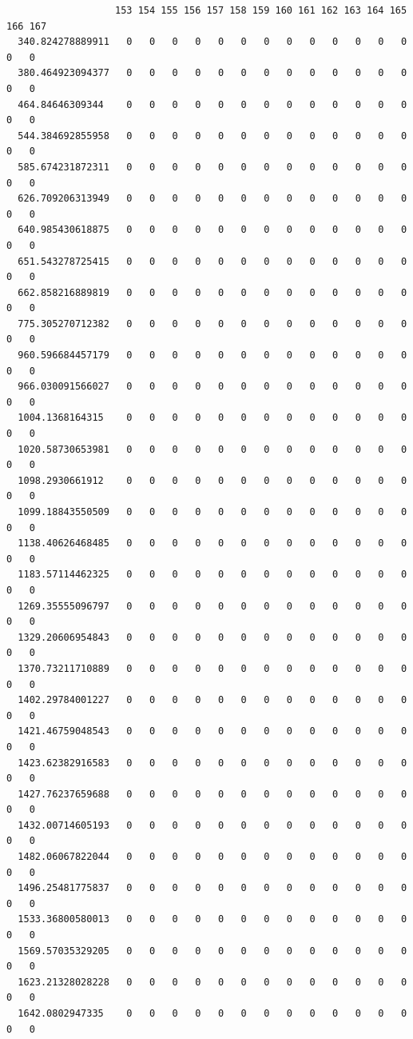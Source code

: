 \documentclass[
  letterpaper,
  DIV=11,
  numbers=noendperiod]{scrartcl}
\begin{document}
\begin{verbatim}
                   153 154 155 156 157 158 159 160 161 162 163 164 165 166 167
  340.824278889911   0   0   0   0   0   0   0   0   0   0   0   0   0   0   0
  380.464923094377   0   0   0   0   0   0   0   0   0   0   0   0   0   0   0
  464.84646309344    0   0   0   0   0   0   0   0   0   0   0   0   0   0   0
  544.384692855958   0   0   0   0   0   0   0   0   0   0   0   0   0   0   0
  585.674231872311   0   0   0   0   0   0   0   0   0   0   0   0   0   0   0
  626.709206313949   0   0   0   0   0   0   0   0   0   0   0   0   0   0   0
  640.985430618875   0   0   0   0   0   0   0   0   0   0   0   0   0   0   0
  651.543278725415   0   0   0   0   0   0   0   0   0   0   0   0   0   0   0
  662.858216889819   0   0   0   0   0   0   0   0   0   0   0   0   0   0   0
  775.305270712382   0   0   0   0   0   0   0   0   0   0   0   0   0   0   0
  960.596684457179   0   0   0   0   0   0   0   0   0   0   0   0   0   0   0
  966.030091566027   0   0   0   0   0   0   0   0   0   0   0   0   0   0   0
  1004.1368164315    0   0   0   0   0   0   0   0   0   0   0   0   0   0   0
  1020.58730653981   0   0   0   0   0   0   0   0   0   0   0   0   0   0   0
  1098.2930661912    0   0   0   0   0   0   0   0   0   0   0   0   0   0   0
  1099.18843550509   0   0   0   0   0   0   0   0   0   0   0   0   0   0   0
  1138.40626468485   0   0   0   0   0   0   0   0   0   0   0   0   0   0   0
  1183.57114462325   0   0   0   0   0   0   0   0   0   0   0   0   0   0   0
  1269.35555096797   0   0   0   0   0   0   0   0   0   0   0   0   0   0   0
  1329.20606954843   0   0   0   0   0   0   0   0   0   0   0   0   0   0   0
  1370.73211710889   0   0   0   0   0   0   0   0   0   0   0   0   0   0   0
  1402.29784001227   0   0   0   0   0   0   0   0   0   0   0   0   0   0   0
  1421.46759048543   0   0   0   0   0   0   0   0   0   0   0   0   0   0   0
  1423.62382916583   0   0   0   0   0   0   0   0   0   0   0   0   0   0   0
  1427.76237659688   0   0   0   0   0   0   0   0   0   0   0   0   0   0   0
  1432.00714605193   0   0   0   0   0   0   0   0   0   0   0   0   0   0   0
  1482.06067822044   0   0   0   0   0   0   0   0   0   0   0   0   0   0   0
  1496.25481775837   0   0   0   0   0   0   0   0   0   0   0   0   0   0   0
  1533.36800580013   0   0   0   0   0   0   0   0   0   0   0   0   0   0   0
  1569.57035329205   0   0   0   0   0   0   0   0   0   0   0   0   0   0   0
  1623.21328028228   0   0   0   0   0   0   0   0   0   0   0   0   0   0   0
  1642.0802947335    0   0   0   0   0   0   0   0   0   0   0   0   0   0   0

\end{verbatim}
\end{document}
